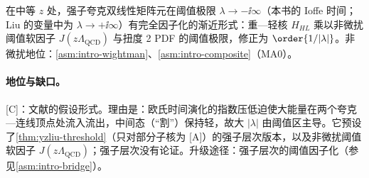 \begin{conjecture}\label{conj:yzliu-threshold-hadronic}
在中等 $z$ 处，强子夸克双线性矩阵元在阈值极限 $\lambda\to-\ii\infty$（本书的 Ioffe 时间；Liu 的变量中为 $\lambda\to+\ii\infty$）有完全因子化的渐近形式：重—轻核 $H_{HL}$ 乘以非微扰阈值软因子 $J(z\Lambda_{\mathrm{QCD}})$ 与扭度 2 PDF 的阈值极限，修正为 $\order{1/|\lambda|}$\cite[式~(3.50)]{Liu:2023onm}。非微扰地位：\cref{asm:intro-wightman}、\cref{asm:intro-composite}（MA0）。
\end{conjecture}

\paragraph{地位与缺口。}[C]：文献\cite{Liu:2023onm}的假设形式。理由是：欧氏时间演化的指数压低迫使大能量在两个夸克—连线顶点处流入流出，中间态（“割”）保持轻，故大 $|\lambda|$ 由阈值区主导。它预设了\cref{thm:yzliu-threshold}（只对部分子核为 [A]）的强子层次版本，以及非微扰阈值软因子 $J(z\Lambda_{\mathrm{QCD}})$；强子层次没有论证。升级途径：强子层次的阈值因子化（参见\cref{asm:intro-bridge}）。
